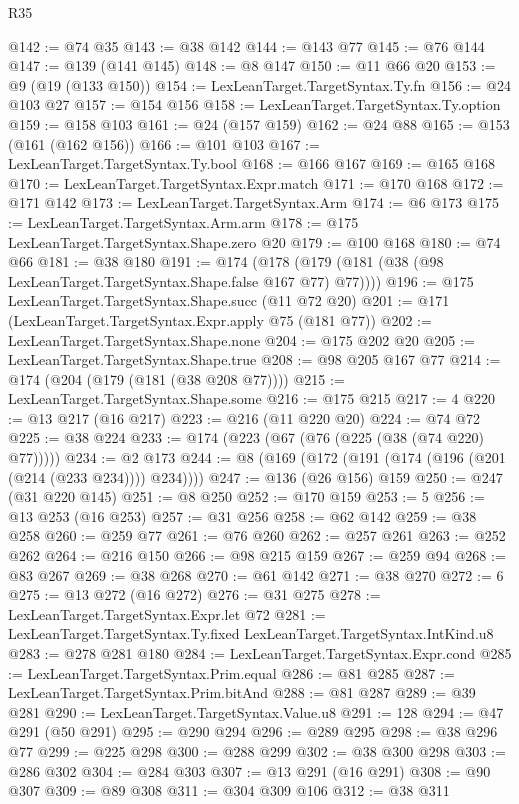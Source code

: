 \begin{lexlean}{R35}
\begin{coremodule}
@142 := @74 @35
@143 := @38 @142
@144 := @143 @77
@145 := @76 @144
@147 := @139 (@141 @145)
@148 := @8 @147
@150 := @11 @66 @20
@153 := @9 (@19 (@133 @150))
@154 := LexLeanTarget.TargetSyntax.Ty.fn
@156 := @24 @103 @27
@157 := @154 @156
@158 := LexLeanTarget.TargetSyntax.Ty.option
@159 := @158 @103
@161 := @24 (@157 @159)
@162 := @24 @88
@165 := @153 (@161 (@162 @156))
@166 := @101 @103
@167 := LexLeanTarget.TargetSyntax.Ty.bool
@168 := @166 @167
@169 := @165 @168
@170 := LexLeanTarget.TargetSyntax.Expr.match
@171 := @170 @168
@172 := @171 @142
@173 := LexLeanTarget.TargetSyntax.Arm
@174 := @6 @173
@175 := LexLeanTarget.TargetSyntax.Arm.arm
@178 := @175 LexLeanTarget.TargetSyntax.Shape.zero @20
@179 := @100 @168
@180 := @74 @66
@181 := @38 @180
@191 := @174 (@178 (@179 (@181 (@38 (@98 LexLeanTarget.TargetSyntax.Shape.false @167 @77) @77))))
@196 := @175 LexLeanTarget.TargetSyntax.Shape.succ (@11 @72 @20)
@201 := @171 (LexLeanTarget.TargetSyntax.Expr.apply @75 (@181 @77))
@202 := LexLeanTarget.TargetSyntax.Shape.none
@204 := @175 @202 @20
@205 := LexLeanTarget.TargetSyntax.Shape.true
@208 := @98 @205 @167 @77
@214 := @174 (@204 (@179 (@181 (@38 @208 @77))))
@215 := LexLeanTarget.TargetSyntax.Shape.some
@216 := @175 @215
@217 := 4
@220 := @13 @217 (@16 @217)
@223 := @216 (@11 @220 @20)
@224 := @74 @72
@225 := @38 @224
@233 := @174 (@223 (@67 (@76 (@225 (@38 (@74 @220) @77)))))
@234 := @2 @173
@244 := @8 (@169 (@172 (@191 (@174 (@196 (@201 (@214 (@233 @234)))) @234))))
@247 := @136 (@26 @156) @159
@250 := @247 (@31 @220 @145)
@251 := @8 @250
@252 := @170 @159
@253 := 5
@256 := @13 @253 (@16 @253)
@257 := @31 @256
@258 := @62 @142
@259 := @38 @258
@260 := @259 @77
@261 := @76 @260
@262 := @257 @261
@263 := @252 @262
@264 := @216 @150
@266 := @98 @215 @159
@267 := @259 @94
@268 := @83 @267
@269 := @38 @268
@270 := @61 @142
@271 := @38 @270
@272 := 6
@275 := @13 @272 (@16 @272)
@276 := @31 @275
@278 := LexLeanTarget.TargetSyntax.Expr.let @72
@281 := LexLeanTarget.TargetSyntax.Ty.fixed LexLeanTarget.TargetSyntax.IntKind.u8
@283 := @278 @281 @180
@284 := LexLeanTarget.TargetSyntax.Expr.cond
@285 := LexLeanTarget.TargetSyntax.Prim.equal
@286 := @81 @285
@287 := LexLeanTarget.TargetSyntax.Prim.bitAnd
@288 := @81 @287
@289 := @39 @281
@290 := LexLeanTarget.TargetSyntax.Value.u8
@291 := 128
@294 := @47 @291 (@50 @291)
@295 := @290 @294
@296 := @289 @295
@298 := @38 @296 @77
@299 := @225 @298
@300 := @288 @299
@302 := @38 @300 @298
@303 := @286 @302
@304 := @284 @303
@307 := @13 @291 (@16 @291)
@308 := @90 @307
@309 := @89 @308
@311 := @304 @309 @106
@312 := @38 @311

\end{coremodule}
\end{lexlean}
